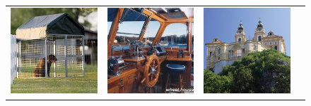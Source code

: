 \documentclass{beamer}
\begin{document}
\begin{frame}
\begin{figure}
{\begin{tabular}{cccc}
\includegraphics[width = 1.5in]{./images/sun397/kennel.jpg} &
\includegraphics[width = 1.5in]{./images/sun397/pilothouse.jpg} &
\includegraphics[width = 1.5in]{./images/sun397/abbey.jpg} \\
\end{tabular}
}
\end{figure}
\end{frame}
\end{document}
